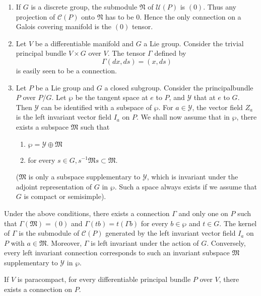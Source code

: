 \begin{examples*}%
  \begin{enumerate}[1)]
  \item If $G$ is a discrete group, the submodule $\mathfrak{N}$ of
    $\mathscr{U}(P)$ is $(0)$. Thus any projection of $\mathscr{C}(P)$
    onto $\mathfrak{N}$ has to be $0$. Hence the only connection on a
    Galois covering manifold is the $(0)$ tensor.  
  \item Let $V$ be a differentiable manifold and $G$ a Lie
    group. Consider the trivial principal bundle $V \times G$ over
    $V$. The tensor $\Gamma$ defined by  
    $$
    \Gamma (dx, ds) = (x, ds)
    $$
    is easily seen to be a connection.
  \item Let $P$ be a Lie group and $G$ a closed subgroup. Consider the
    principal\pageoriginale bundle $P$ over $P/G$. Let $\wp$ be the tangent space at
    $e$ to $P$, and $\mathscr{Y}$ that at $e$ to $G$. Then
    $\mathscr{Y}$ can be identified with a subspace of $\wp$. For $a
    \in \mathscr{Y}$, the vector field $Z_a$ is the left invariant
    vector field $I_a$ on $P$. We shall now assume that in $\wp$,
    there exists a subspace $\mathfrak{M}$ such that  
    \begin{enumerate}[1)]
    \item $\wp = \mathscr{Y} \oplus \mathfrak{M}$
    \item for every $s \in G, s^{-1} \mathfrak{M} s \subset \mathfrak{M}$.
    \end{enumerate}
    ($\mathfrak{M}$ is only a subspace supplementary to $\mathscr{Y}$,
    which is invariant under the adjoint representation of $G$ in
    $\wp$. Such a space always exists if we assume that $G$ is compact
    or semisimple). 
  \end{enumerate}
\end{examples*}

Under the above conditions, there exists a connection $\Gamma$ and
only one on $P$ such that $\Gamma(\mathfrak{M}) = (0)$ and $\Gamma(tb)
= t (\Gamma b)$ for every $b \in \wp$ and $t \in G$. The kernel of
$\Gamma$ is the submodule of $\mathscr{C}(P)$ generated by the left
invariant vector field $I_a$ on $P$ with $a \in
\mathfrak{M}$. Moreover, $\Gamma$ is left invariant under the action
of $G$. Conversely, every left invariant connection corresponds to
such an invariant subspace $\mathfrak{M}$ supplementary to
$\mathscr{Y}$ in $\wp$. 

\setcounter{theorem}{0}
\begin{theorem}\label{chap3:sec1:thm1}%
  If $V$ is paracompact, for every differentiable principal bundle $P$
  over $V$, there exists a connection on $P$. 
\end{theorem}

